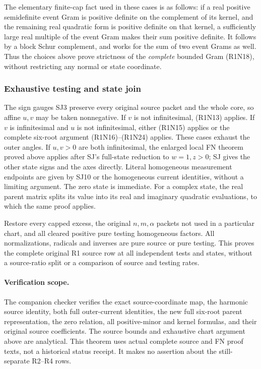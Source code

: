 The elementary finite-cap fact used in these cases is as follows:
if a real positive semidefinite event Gram is positive definite on
the complement of its kernel, and the remaining real quadratic
form is positive definite on that kernel, a sufficiently large
real multiple of the event Gram makes their sum positive definite.
It follows by a block Schur complement, and works for the sum of
two event Grams as well.  Thus the choices above prove strictness
of the \emph{complete} bounded Gram (R1N18), without restricting
any normal or state coordinate.

\subsubsection*{Exhaustive testing and state join}

The sign gauges SJ3 preserve every original source packet and the
whole core, so affine $u,v$ may be taken nonnegative.
If $v$ is not infinitesimal, (R1N13) applies.
If $v$ is infinitesimal and $u$ is not infinitesimal, either
(R1N15) applies or the complete six-root argument
(R1N16)--(R1N24) applies.  These cases exhaust the outer angles.
If $u,v>0$ are both infinitesimal, the enlarged local FN theorem
proved above applies after SJ's full-state reduction to $w=1,z>0$;
SJ gives the other state signs and the axes directly.
Literal homogeneous measurement endpoints are given by SJ10 or
the homogeneous current identities, without a limiting argument.
The zero state is immediate.  For a complex state, the real
parent matrix splits its value into its real and imaginary
quadratic evaluations, to which the same proof applies.

Restore every capped excess, the original $n,m,\alpha$ packets
not used in a particular chart, and all cleared positive pure
testing homogeneous factors.  All normalizations, radicals and
inverses are pure source or pure testing.  This proves the
complete original R1 source row at all independent tests and
states, without a source-ratio split or a comparison of source
and testing rates.

\paragraph{Verification scope.}
The companion checker verifies the exact source-coordinate map,
the harmonic source identity, both full outer-current identities,
the new full six-root parent representation, the zero relation,
all positive-minor and kernel formulas, and their original
source coefficients.  The source bounds and exhaustive chart
argument above are analytical.  This theorem uses actual complete
source and FN proof texts, not a historical status receipt.
It makes no assertion about the still-separate R2--R4 rows.


